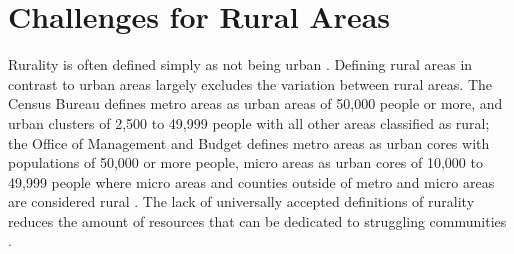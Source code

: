 \section{Challenges for Rural Areas}

 Rurality is often defined simply as not being urban \citep{robertson_rural_2007}. Defining rural areas in contrast to urban areas largely excludes the variation between rural areas. The Census Bureau defines metro areas as urban areas of 50,000 people or more, and urban clusters of 2,500 to 49,999 people with all other areas classified as rural; the Office of Management and Budget defines metro areas as urban cores with populations of 50,000 or more people, micro areas as urban cores of 10,000 to 49,999 people where micro areas and counties outside of metro and micro areas are considered rural \citep{health_resources__services_administration_defining_2022}. %
 The lack of universally accepted definitions of rurality reduces the amount of resources that can be dedicated to struggling communities \citep{yousey_defining_2018}. 
 

